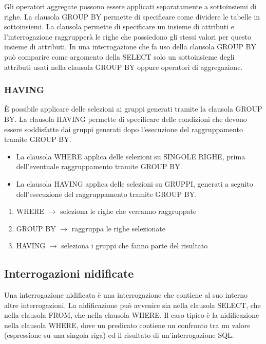 \documentclass[a4paper]{article}
\begin{document}
Gli operatori aggregate possono essere applicati separatamente a
sottoinsiemi di righe.
La clausola GROUP BY permette di specificare come dividere le
tabelle in sottoinsiemi. La clausola permette di specificare un insieme di attributi e
l’interrogazione raggrupperà le righe che possiedono gli stessi
valori per questo insieme di attributi.
In una interrogazione che fa uso della clausola GROUP BY può comparire
come argomento della SELECT solo un sottoinsieme degli attributi usati nella
clausola GROUP BY oppure operatori di aggregazione.

\subsubsection{HAVING}

È possibile applicare delle selezioni ai gruppi generati tramite la
clausola GROUP BY. La clausola HAVING permette di specificare delle condizioni che
devono essere soddisfatte dai gruppi generati dopo l’esecuzione
del raggruppamento tramite GROUP BY.

\begin{Observation}{}{}
    \begin{itemize}
        \item La clausola WHERE applica delle selezioni su SINGOLE RIGHE, prima
        dell’eventuale raggruppamento tramite GROUP BY.
        \item La clausola HAVING applica delle selezioni su GRUPPI, generati a
        seguito dell’esecuzione del raggruppamento tramite GROUP BY.
    \end{itemize}

    \begin{enumerate}
        \item WHERE $\to$ seleziona le righe che
        verranno raggruppate
        \item GROUP BY $\to$ raggruppa le righe selezionate
        \item HAVING $\to$ seleziona i gruppi che fanno parte del risultato
    \end{enumerate}
\end{Observation}

\subsection{Interrogazioni nidificate}

Una interrogazione nidificata è una interrogazione che contiene al
suo interno altre interrogazioni.
La nidificazione può avvenire sia nella clausola SELECT, che nella
clausola FROM, che nella clausola WHERE.
Il caso tipico è la nidificazione nella clausola WHERE, dove un
predicato contiene un confronto tra un valore (espressione su una
singola riga) ed il risultato di un’interrogazione SQL.
\end{document}
